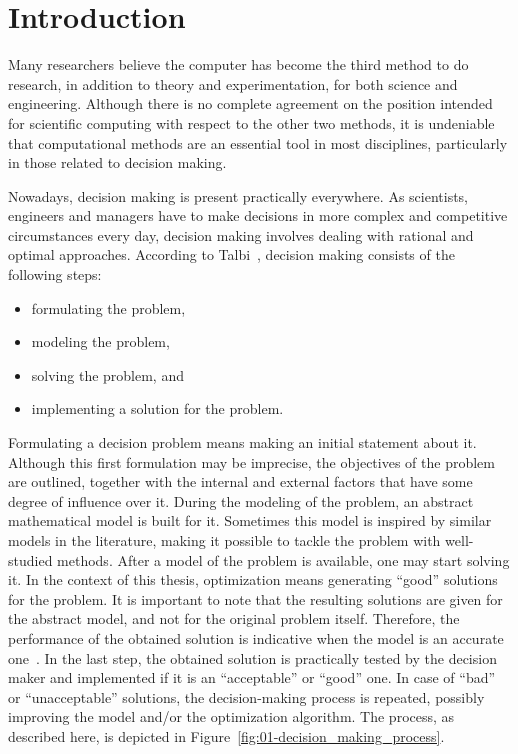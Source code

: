 
\chapter{Introduction \label{chap:01-Introduction}}


\noindent Many researchers believe the computer has become the third
method to do research, in addition to theory and experimentation,
for both science and engineering. Although there is no complete agreement
on the position intended for scientific computing with respect to
the other two methods, it is undeniable that computational methods
are an essential tool in most disciplines, particularly in those related
to decision making.

Nowadays, decision making is present practically everywhere. As scientists,
engineers and managers have to make decisions in more complex and
competitive circumstances every day, decision making involves dealing
with rational and optimal approaches. According to Talbi~\cite{Talbi_Metaheuristics:2009},
decision making consists of the following steps:
\begin{itemize}
\item formulating the problem,
\item modeling the problem, 
\item solving the problem, and
\item implementing a solution for the problem.
\end{itemize}
Formulating a decision problem means making an initial statement about
it. Although this first formulation may be imprecise, the objectives
of the problem are outlined, together with the internal and external
factors that have some degree of influence over it. During the modeling
of the problem, an abstract mathematical model is built for it. Sometimes
this model is inspired by similar models in the literature, making
it possible to tackle the problem with well-studied methods. After
a model of the problem is available, one may start solving it. In
the context of this thesis, optimization means generating ``good''
solutions for the problem. It is important to note that the resulting
solutions are given for the abstract model, and not for the original
problem itself. Therefore, the performance of the obtained solution
is indicative when the model is an accurate one~\cite{Talbi_Metaheuristics:2009}.
In the last step, the obtained solution is practically tested by the
decision maker and implemented if it is an ``acceptable'' or ``good''
one. In case of ``bad'' or ``unacceptable'' solutions, the decision-making
process is repeated, possibly improving the model and/or the optimization
algorithm. The process, as described here, is depicted in Figure~\ref{fig:01-decision_making_process}.

